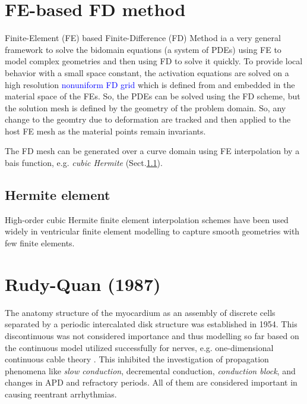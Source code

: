 \section{FE-based FD method}
\label{sec:FE-based_FD}

Finite-Element (FE) based Finite-Difference (FD) Method ia a very general
framework to solve the bidomain equations (a system of PDEs) using FE to model
complex geometries and then using FD to solve it quickly. To provide local
behavior with a small space constant, the activation equations are solved on a
high resolution \textcolor{blue}{nonuniform FD grid} which is defined from and
embedded in the material space of the FEs. So, the PDEs can be solved using the
FD scheme, but the solution mesh is defined by the geometry of the problem
domain. So, any change to the geomtry due to deformation are tracked and then
applied to the host FE mesh as the material points remain invariants.



The FD mesh can be generated over a curve domain using FE interpolation by a
bais function, e.g. {\it cubic Hermite} (Sect.\ref{sec:Hermite_element}). 



\subsection{Hermite element}
\label{sec:Hermite_element}

High-order cubic Hermite finite element interpolation schemes have been used
widely in ventricular finite element modelling to capture smooth geometries with
few finite elements.

\section{Rudy-Quan (1987)}
\label{sec:rudy-quan-1987}

The anatomy structure of the myocardium as an assembly of discrete cells
separated by a periodic intercalated disk structure was established in 1954.
This discontinuous was not considered importance and thus modelling so far based
on the continuous model utilized successfully for nerves, e.g. one-dimensional
continuous cable theory \citep{jack1975}. This inhibited the investigation of
propagation phenomena like {\it slow conduction}, decremental conduction, {\it
conduction block}, and changes in APD and refractory periods. All of them are
considered important in causing reentrant arrhythmias. 

